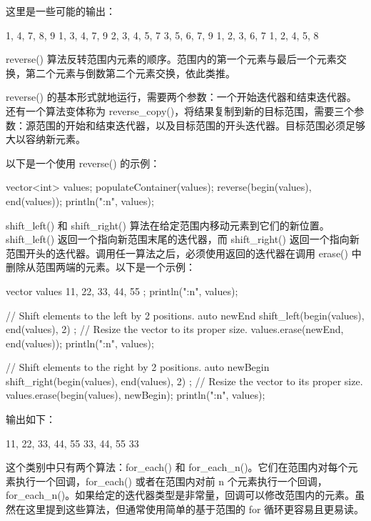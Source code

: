 这里是一些可能的输出：

\begin{shell}
1, 4, 7, 8, 9
1, 3, 4, 7, 9
2, 3, 4, 5, 7
3, 5, 6, 7, 9
1, 2, 3, 6, 7
1, 2, 4, 5, 8
\end{shell}


reverse() 算法反转范围内元素的顺序。范围内的第一个元素与最后一个元素交换，第二个元素与倒数第二个元素交换，依此类推。

reverse() 的基本形式就地运行，需要两个参数：一个开始迭代器和结束迭代器。还有一个算法变体称为 reverse\_copy()，将结果复制到新的目标范围，需要三个参数：源范围的开始和结束迭代器，以及目标范围的开头迭代器。目标范围必须足够大以容纳新元素。

以下是一个使用 reverse() 的示例：

\begin{cpp}
vector<int> values;
populateContainer(values);
reverse(begin(values), end(values));
println("{:n}", values);
\end{cpp}


shift\_left() 和 shift\_right() 算法在给定范围内移动元素到它们的新位置。shift\_left() 返回一个指向新范围末尾的迭代器，而 shift\_right() 返回一个指向新范围开头的迭代器。调用任一算法之后，必须使用返回的迭代器在调用 erase() 中删除从范围两端的元素。以下是一个示例：

\begin{cpp}
vector values { 11, 22, 33, 44, 55 };
println("{:n}", values);

// Shift elements to the left by 2 positions.
auto newEnd { shift_left(begin(values), end(values), 2) };
// Resize the vector to its proper size.
values.erase(newEnd, end(values));
println("{:n}", values);

// Shift elements to the right by 2 positions.
auto newBegin { shift_right(begin(values), end(values), 2) };
// Resize the vector to its proper size.
values.erase(begin(values), newBegin);
println("{:n}", values);
\end{cpp}

输出如下：

\begin{shell}
11, 22, 33, 44, 55
33, 44, 55
33
\end{shell}


这个类别中只有两个算法：for\_each() 和 for\_each\_n()。它们在范围内对每个元素执行一个回调，for\_each() 或者在范围内对前 n 个元素执行一个回调，for\_each\_n()。如果给定的迭代器类型是非常量，回调可以修改范围内的元素。虽然在这里提到这些算法，但通常使用简单的基于范围的 for 循环更容易且更易读。

